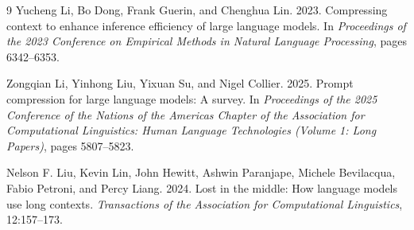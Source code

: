 \documentclass[10pt,a4paper,twocolumn]{article}
\begin{document}
\begin{thebibliography}{9}
Yucheng Li, Bo Dong, Frank Guerin, and Chenghua Lin. 2023.
\newblock Compressing context to enhance inference efficiency of large language models.
\newblock In \emph{Proceedings of the 2023 Conference on Empirical Methods in Natural Language Processing}, pages 6342--6353.

Zongqian Li, Yinhong Liu, Yixuan Su, and Nigel Collier. 2025.
\newblock Prompt compression for large language models: A survey.
\newblock In \emph{Proceedings of the 2025 Conference of the Nations of the Americas Chapter of the Association for Computational Linguistics: Human Language Technologies (Volume 1: Long Papers)}, pages 5807--5823.

Nelson F. Liu, Kevin Lin, John Hewitt, Ashwin Paranjape, Michele Bevilacqua, Fabio Petroni, and Percy Liang. 2024.
\newblock Lost in the middle: How language models use long contexts.
\newblock \emph{Transactions of the Association for Computational Linguistics}, 12:157--173.

\end{thebibliography}
\end{document}
